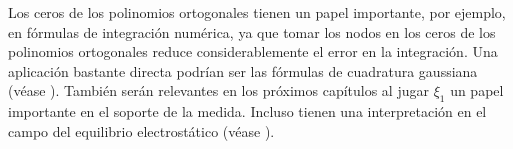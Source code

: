 Los ceros de los polinomios ortogonales tienen un papel importante, por ejemplo, en fórmulas de integración numérica, ya que tomar los nodos en los ceros de los polinomios ortogonales reduce considerablemente el error en la integración. Una aplicación bastante directa podrían ser las fórmulas de cuadratura gaussiana (véase \cite[Ch. I, Sección 6]{chihara}). También serán relevantes en los próximos capítulos al jugar $\xi_1$ un papel importante en el soporte de la medida. Incluso tienen una interpretación en el campo del equilibrio electrostático (véase \cite{Steinerberger}).